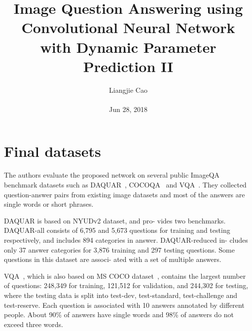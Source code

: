 \documentclass[10pt,twocolumn,letterpaper]{article}
\begin{document}
\title{\textbf{Image Question Answering using Convolutional Neural Network with Dynamic Parameter Prediction II
}}
\author{Liangjie Cao\\\\ Jun 28, 2018}
\maketitle
\section{Final datasets}
The authors evaluate the proposed network on several public ImageQA benchmark datasets such as DAQUAR~\cite{name17}, COCOQA~\cite{name23} and VQA~\cite{name1}. They collected question-answer pairs from existing image datasets and most of the answers are single words or short phrases.
\par DAQUAR is based on NYUDv2 dataset, and pro-
vides two benchmarks. DAQUAR-all consists of 6,795 and
5,673 questions for training and testing respectively, and
includes 894 categories in answer. DAQUAR-reduced in-
cludes only 37 answer categories for 3,876 training and 297
testing questions. Some questions in this dataset are associ-
ated with a set of multiple answers.
 \par VQA~\cite{name1}, which is also based on MS COCO dataset~\cite{name15},
contains the largest number of questions: 248,349 for training, 121,512 for validation, and 244,302 for testing, where the testing data is split into test-dev, test-standard, test-challenge and test-reserve. Each question is associated with 10 answers annotated by different people. About 90\% of answers have single words and 98\% of answers do not exceed three words.
\end{document}
